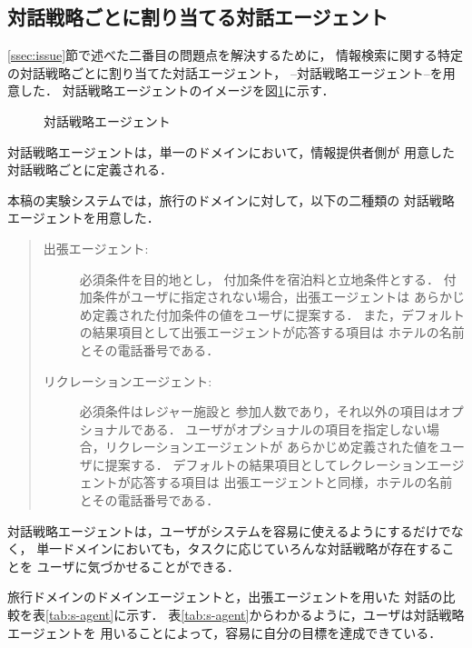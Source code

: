 \subsection{対話戦略ごとに割り当てる対話エージェント}\label{sec:strategy}
\ref{ssec:issue}節で述べた二番目の問題点を解決するために，
情報検索に関する特定の対話戦略ごとに割り当てた対話エージェント，
--対話戦略エージェント--を用意した．
対話戦略エージェントのイメージを図\ref{fig:agentS}に示す．

\begin{figure}[htbp]
\begin{center}
\end{center}
\caption{対話戦略エージェント}\label{fig:agentS}
\end{figure}
対話戦略エージェントは，単一のドメインにおいて，情報提供者側が
用意した対話戦略ごとに定義される．

本稿の実験システムでは，旅行のドメインに対して，以下の二種類の
対話戦略エージェントを用意した．
\begin{quote}
\begin{description}
\item[出張エージェント:] 必須条件を目的地とし，
付加条件を宿泊料と立地条件とする．
付加条件がユーザに指定されない場合，出張エージェントは
あらかじめ定義された付加条件の値をユーザに提案する．
また，デフォルトの結果項目として出張エージェントが応答する項目は
ホテルの名前とその電話番号である．
\item[リクレーションエージェント:] 必須条件はレジャー施設と
参加人数であり，それ以外の項目はオプショナルである．
ユーザがオプショナルの項目を指定しない場合，リクレーションエージェントが
あらかじめ定義された値をユーザに提案する．
デフォルトの結果項目としてレクレーションエージェントが応答する項目は
出張エージェントと同様，ホテルの名前とその電話番号である．
\end{description}
\end{quote}

対話戦略エージェントは，ユーザがシステムを容易に使えるようにするだけでなく，
単一ドメインにおいても，タスクに応じていろんな対話戦略が存在することを
ユーザに気づかせることができる．

旅行ドメインのドメインエージェントと，出張エージェントを用いた
対話の比較を表\ref{tab:s-agent}に示す．
表\ref{tab:s-agent}からわかるように，ユーザは対話戦略エージェントを
用いることによって，容易に自分の目標を達成できている．

